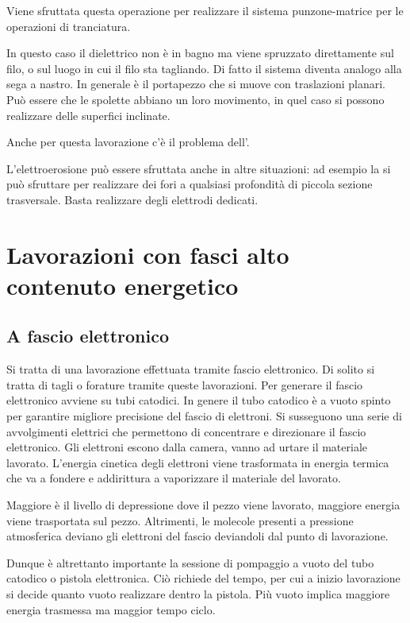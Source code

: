 Viene sfruttata questa operazione per realizzare il sistema punzone-matrice per le operazioni di tranciatura.

In questo caso il dielettrico non è in bagno ma viene spruzzato direttamente sul filo, o sul luogo in cui il filo sta tagliando.
Di fatto il sistema diventa analogo alla sega a nastro.
In generale è il portapezzo che si muove con traslazioni planari. Può essere che le spolette abbiano un loro movimento, in quel caso si possono realizzare delle superfici inclinate.

Anche per questa lavorazione c'è il problema dell'. 

L'elettroerosione può essere sfruttata anche in altre situazioni: ad esempio la si può sfruttare per realizzare dei fori a qualsiasi profondità di piccola sezione trasversale. Basta realizzare degli elettrodi dedicati.

\section{Lavorazioni con fasci alto contenuto energetico}
\subsection{A fascio elettronico}
Si tratta di una lavorazione effettuata tramite fascio elettronico.
Di solito si tratta di tagli o forature tramite queste lavorazioni.
Per generare il fascio elettronico avviene su tubi catodici.
In genere il tubo catodico è a vuoto spinto per garantire migliore precisione del fascio di elettroni.
Si susseguono una serie di avvolgimenti elettrici che permettono di concentrare e direzionare il fascio elettronico.
Gli elettroni escono dalla camera, vanno ad urtare il materiale lavorato.
L'energia cinetica degli elettroni viene trasformata in energia termica che va a fondere e addirittura a vaporizzare il materiale del lavorato.

Maggiore è il livello di depressione dove il pezzo viene lavorato, maggiore energia viene trasportata sul pezzo. Altrimenti, le molecole presenti a pressione atmosferica deviano gli elettroni del fascio deviandoli dal punto di lavorazione.

Dunque è altrettanto importante la sessione di pompaggio a vuoto del tubo catodico o pistola elettronica. Ciò richiede del tempo, per cui a inizio lavorazione si decide quanto vuoto realizzare dentro la pistola. Più vuoto implica maggiore energia trasmessa ma maggior tempo ciclo.

